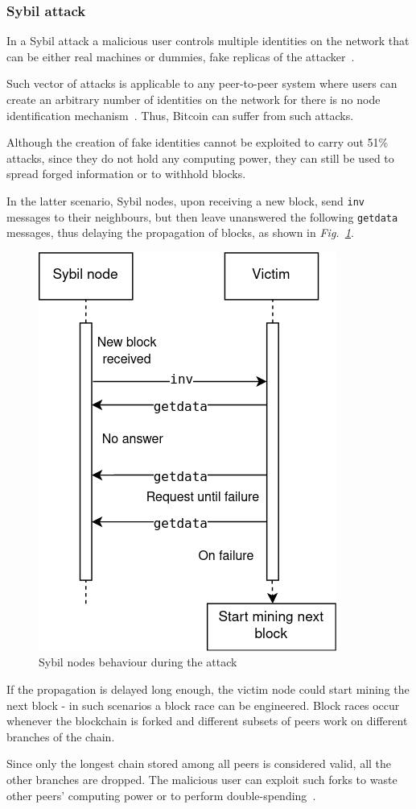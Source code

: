 \documentclass[12pt, letterpaper, twoside]{article}
\begin{document}
\subsubsection{Sybil attack}\label{sec:sybil}
In a Sybil attack a malicious user controls multiple identities on the network that can be either real machines or dummies, fake replicas of the attacker~\cite{douceur2002sybil}.

Such vector of attacks is applicable to any peer-to-peer system where users can create an arbitrary number of identities on the network for there is no node identification mechanism~\cite{kedziora-sybil-ledgers}. Thus, Bitcoin can suffer from such attacks.

Although the creation of fake identities cannot be exploited to carry out 51\% attacks, since they do not hold any computing power, they can still be used to spread forged information or to withhold blocks.

In the latter scenario, Sybil nodes, upon receiving a new block, send \texttt{inv} messages to their neighbours, but then leave unanswered the following \texttt{getdata} messages, thus delaying the propagation of blocks, as shown in \emph{Fig.~\ref{fig:sybil}}.

\begin{figure}[h!]
	\includegraphics[width=.4\textwidth]{pict/sybil.png}
	\centering
	\caption{Sybil nodes behaviour during the attack}
	\label{fig:sybil}
\end{figure}

If the propagation is delayed long enough, the victim node could start mining the next block - in such scenarios a block race can be engineered. Block races occur whenever the blockchain is forked and different subsets of peers work on different branches of the chain.

Since only the longest chain stored among all peers is considered valid, all the other branches are dropped. The malicious user can exploit such forks to waste other peers' computing power or to perform double-spending~\cite{zhang-ds-sybil}. 
\end{document}
